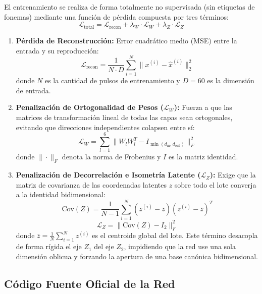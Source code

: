 \documentclass[11pt,a4paper,openany]{book}
\theoremstyle{definition}
\begin{document}
El entrenamiento se realiza de forma totalmente no supervisada (sin etiquetas de fonemas) mediante una función de pérdida compuesta por tres términos:
\begin{equation}
    \mathcal{L}_{\text{total}} = \mathcal{L}_{\text{recon}} + \lambda_W \cdot \mathcal{L}_W + \lambda_Z \cdot \mathcal{L}_Z
    \label{eq:loss_total}
\end{equation}

\begin{enumerate}
    \item \textbf{Pérdida de Reconstrucción:} Error cuadrático medio (MSE) entre la entrada y su reproducción:
    \begin{equation}
        \mathcal{L}_{\text{recon}} = \frac{1}{N \cdot D} \sum_{i=1}^N \|x^{(i)} - \hat{x}^{(i)}\|_2^2
    \end{equation}
    donde $N$ es la cantidad de pulsos de entrenamiento y $D = 60$ es la dimensión de entrada.
    \item \textbf{Penalización de Ortogonalidad de Pesos ($\mathcal{L}_W$):} Fuerza a que las matrices de transformación lineal de todas las capas sean ortogonales, evitando que direcciones independientes colapsen entre sí:
    \begin{equation}
        \mathcal{L}_W = \sum_{l=1}^6 \|W_l W_l^T - I_{\min(d_{\text{in}}, d_{\text{out}})}\|_F^2
    \end{equation}
    donde $\|\cdot\|_F$ denota la norma de Frobenius y $I$ es la matriz identidad.
    \item \textbf{Penalización de Decorrelación e Isometría Latente ($\mathcal{L}_Z$):} Exige que la matriz de covarianza de las coordenadas latentes $z$ sobre todo el lote converja a la identidad bidimensional:
    \begin{equation}
        \text{Cov}(Z) = \frac{1}{N - 1} \sum_{i=1}^N (z^{(i)} - \bar{z})(z^{(i)} - \bar{z})^T
    \end{equation}
    \begin{equation}
        \mathcal{L}_Z = \|\text{Cov}(Z) - I_2\|_F^2
    \end{equation}
    donde $\bar{z} = \frac{1}{N} \sum_{i=1}^N z^{(i)}$ es el centroide global del lote. Este término desacopla de forma rígida el eje $Z_1$ del eje $Z_2$, impidiendo que la red use una sola dimensión oblicua y forzando la apertura de una base canónica bidimensional.
\end{enumerate}

\subsection{Código Fuente Oficial de la Red}
\label{subsec:codigo_oficial}
\end{document}
